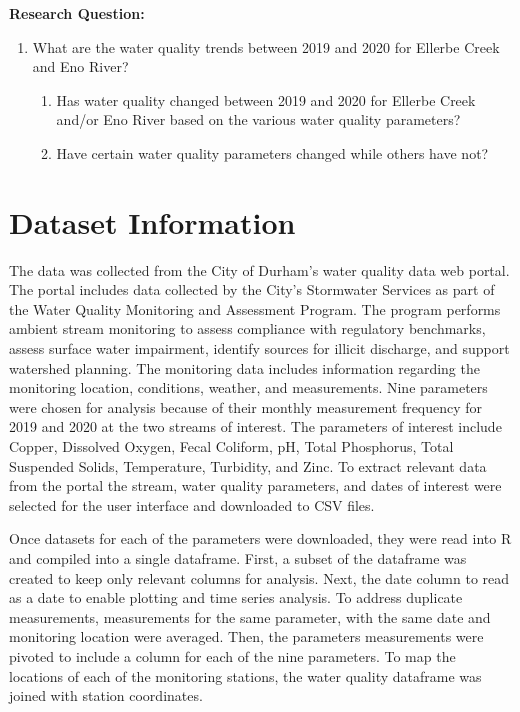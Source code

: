 \documentclass[
  12pt,
]{article}
\providecommand{\tightlist}{%
  \setlength{\itemsep}{0pt}\setlength{\parskip}{0pt}}
\begin{document}
\textbf{Research Question:}

\begin{enumerate}
\def\labelenumi{\arabic{enumi}.}
\tightlist
\item
  What are the water quality trends between 2019 and 2020 for Ellerbe
  Creek and Eno River?

  \begin{enumerate}
  \def\labelenumii{\alph{enumii}.}
  \tightlist
  \item
    Has water quality changed between 2019 and 2020 for Ellerbe Creek
    and/or Eno River based on the various water quality parameters?
  \item
    Have certain water quality parameters changed while others have not?
  \end{enumerate}
\end{enumerate}

\hypertarget{dataset-information}{%
\section{Dataset Information}\label{dataset-information}}

The data was collected from the City of Durham's water quality data web
portal. The portal includes data collected by the City's Stormwater
Services as part of the Water Quality Monitoring and Assessment Program.
The program performs ambient stream monitoring to assess compliance with
regulatory benchmarks, assess surface water impairment, identify sources
for illicit discharge, and support watershed planning. The monitoring
data includes information regarding the monitoring location, conditions,
weather, and measurements. Nine parameters were chosen for analysis
because of their monthly measurement frequency for 2019 and 2020 at the
two streams of interest. The parameters of interest include Copper,
Dissolved Oxygen, Fecal Coliform, pH, Total Phosphorus, Total Suspended
Solids, Temperature, Turbidity, and Zinc. To extract relevant data from
the portal the stream, water quality parameters, and dates of interest
were selected for the user interface and downloaded to CSV files.

Once datasets for each of the parameters were downloaded, they were read
into R and compiled into a single dataframe. First, a subset of the
dataframe was created to keep only relevant columns for analysis. Next,
the date column to read as a date to enable plotting and time series
analysis. To address duplicate measurements, measurements for the same
parameter, with the same date and monitoring location were averaged.
Then, the parameters measurements were pivoted to include a column for
each of the nine parameters. To map the locations of each of the
monitoring stations, the water quality dataframe was joined with station
coordinates.
\end{document}
